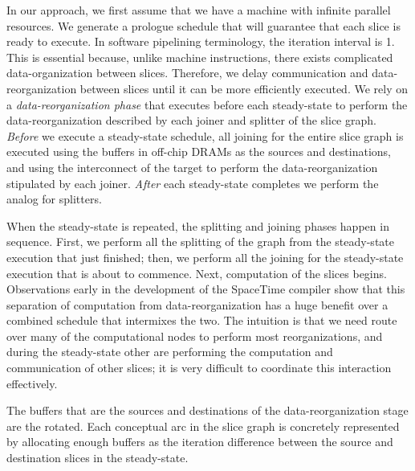 In our approach, we first assume that we have a machine with infinite
parallel resources.  We generate a prologue schedule that will
guarantee that each slice is ready to execute.  In software pipelining
terminology, the iteration interval is 1.  This is essential because,
unlike machine instructions, there exists complicated
data-organization between slices. Therefore, we delay communication
and data-reorganization between slices until it can be more
efficiently executed.  We rely on a {\it data-reorganization
phase} that executes before each steady-state to perform the
data-reorganization described by each joiner and splitter of the slice
graph.  {\it Before} we execute a steady-state schedule, all joining
for the entire slice graph is executed using the buffers in off-chip
DRAMs as the sources and destinations, and using the interconnect of
the target to perform the data-reorganization stipulated by each
joiner.  {\it After} each steady-state completes we perform the analog
for splitters.

When the steady-state is repeated, the splitting and joining phases
happen in sequence.  First, we perform all the splitting of the graph
from the steady-state execution that just finished; then, we perform
all the joining for the steady-state execution that is about to
commence. Next, computation of the slices begins.  Observations early
in the development of the SpaceTime compiler show that this separation
of computation from data-reorganization has a huge benefit over a
combined schedule that intermixes the two.  The intuition is that we
need route over many of the computational nodes to perform most
reorganizations, and during the steady-state other are performing the
computation and communication of other slices; it is very difficult to
coordinate this interaction effectively.

The buffers that are the sources and destinations of the
data-reorganization stage are the rotated.  Each conceptual arc in the
slice graph is concretely represented by allocating enough buffers as
the iteration difference between the source and destination slices in
the steady-state.

